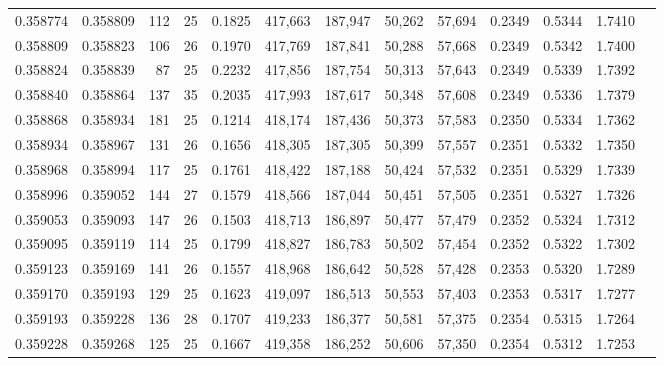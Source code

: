 \begin{tabular}{rrrrrrrrrrrrr}
0.358774 & 0.358809 &   112 &  25 &                                     0.1825 & 417,663 & 187,947 &  50,262 &  57,694 & 0.2349 & 0.5344 & 1.7410 \\
0.358809 & 0.358823 &   106 &  26 &                                     0.1970 & 417,769 & 187,841 &  50,288 &  57,668 & 0.2349 & 0.5342 & 1.7400 \\
0.358824 & 0.358839 &    87 &  25 &                                     0.2232 & 417,856 & 187,754 &  50,313 &  57,643 & 0.2349 & 0.5339 & 1.7392 \\
0.358840 & 0.358864 &   137 &  35 &                                     0.2035 & 417,993 & 187,617 &  50,348 &  57,608 & 0.2349 & 0.5336 & 1.7379 \\
0.358868 & 0.358934 &   181 &  25 &                                     0.1214 & 418,174 & 187,436 &  50,373 &  57,583 & 0.2350 & 0.5334 & 1.7362 \\
0.358934 & 0.358967 &   131 &  26 &                                     0.1656 & 418,305 & 187,305 &  50,399 &  57,557 & 0.2351 & 0.5332 & 1.7350 \\
0.358968 & 0.358994 &   117 &  25 &                                     0.1761 & 418,422 & 187,188 &  50,424 &  57,532 & 0.2351 & 0.5329 & 1.7339 \\
0.358996 & 0.359052 &   144 &  27 &                                     0.1579 & 418,566 & 187,044 &  50,451 &  57,505 & 0.2351 & 0.5327 & 1.7326 \\
0.359053 & 0.359093 &   147 &  26 &                                     0.1503 & 418,713 & 186,897 &  50,477 &  57,479 & 0.2352 & 0.5324 & 1.7312 \\
0.359095 & 0.359119 &   114 &  25 &                                     0.1799 & 418,827 & 186,783 &  50,502 &  57,454 & 0.2352 & 0.5322 & 1.7302 \\
0.359123 & 0.359169 &   141 &  26 &                                     0.1557 & 418,968 & 186,642 &  50,528 &  57,428 & 0.2353 & 0.5320 & 1.7289 \\
0.359170 & 0.359193 &   129 &  25 &                                     0.1623 & 419,097 & 186,513 &  50,553 &  57,403 & 0.2353 & 0.5317 & 1.7277 \\
0.359193 & 0.359228 &   136 &  28 &                                     0.1707 & 419,233 & 186,377 &  50,581 &  57,375 & 0.2354 & 0.5315 & 1.7264 \\
0.359228 & 0.359268 &   125 &  25 &                                     0.1667 & 419,358 & 186,252 &  50,606 &  57,350 & 0.2354 & 0.5312 & 1.7253 \\

\end{tabular}
